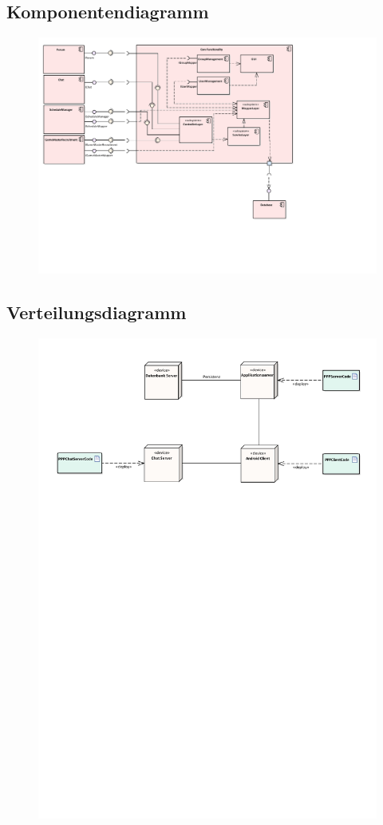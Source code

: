 \subsection*{Komponentendiagramm}
\begin{figure}[h!]
	\centering
	\includegraphics[width = 0.8\linewidth]{docs/7_Komponentendiagramm/ComponentDiagram.pdf}
	\label{fig:CompDia}
\end{figure}

\vfill

\subsection*{Verteilungsdiagramm}
\begin{figure}[h!]
	\centering
	\includegraphics[width = 0.8\linewidth]{docs/8_Verteilungsdiagramm/DeploymentDiagram.pdf}
	\label{fig:VerteilungsDia}
\end{figure}